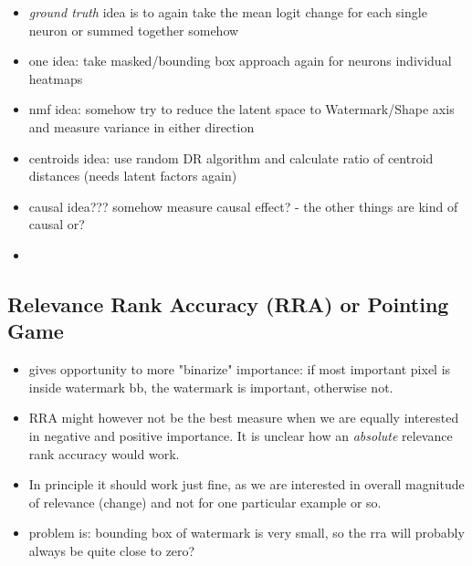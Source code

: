 \begin{itemize}
    \item \textit{ground truth} idea is to again take the mean logit change for each single neuron or summed together somehow
    \item one idea: take masked/bounding box approach again for neurons individual heatmaps
    \item nmf idea: somehow try to reduce the latent space to Watermark/Shape axis and measure variance in either direction
    \item centroids idea: use random DR algorithm and calculate ratio of centroid distances (needs latent factors again)
    \item causal idea??? somehow measure causal effect? - the other things are kind of causal or?
    \item 
\end{itemize}

\subsection{Relevance Rank Accuracy (RRA) or Pointing Game}
\begin{itemize}
    \item gives opportunity to more "binarize" importance: if most important pixel is inside watermark bb, the watermark is important, otherwise not.
    \item RRA might however not be the best measure when we are equally interested in negative and positive importance. It is unclear how an \textit{absolute} relevance rank accuracy would work. 
    \item In principle it should work just fine, as we are interested in overall magnitude of relevance (change) and not for one particular example or so.
    \item problem is: bounding box of watermark is very small, so the rra will probably always be quite close to zero?
\end{itemize}

